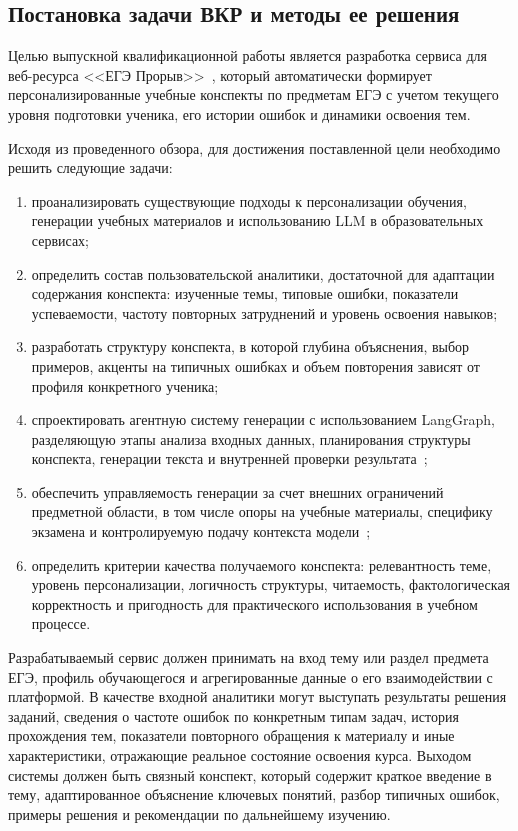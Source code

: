 \documentclass[a4paper,12pt]{extarticle}
\begin{document}
\subsection{Постановка задачи ВКР и методы ее решения}

Целью выпускной квалификационной работы является разработка сервиса для веб-ресурса <<ЕГЭ Прорыв>>~\cite{exambreakout2026}, 
который автоматически формирует персонализированные учебные конспекты по предметам ЕГЭ с учетом текущего уровня 
подготовки ученика, его истории ошибок и динамики освоения тем.

Исходя из проведенного обзора, для достижения поставленной цели необходимо решить следующие задачи:

\begin{enumerate}
    \item проанализировать существующие подходы к персонализации обучения, генерации учебных материалов и 
	использованию LLM в образовательных сервисах;
    \item определить состав пользовательской аналитики, достаточной для адаптации содержания конспекта: 
	изученные темы, типовые ошибки, показатели успеваемости, частоту повторных затруднений и уровень освоения навыков;
    \item разработать структуру конспекта, в которой глубина объяснения, выбор примеров, акценты на типичных 
	ошибках и объем повторения зависят от профиля конкретного ученика;
    \item спроектировать агентную систему генерации с использованием LangGraph, разделяющую этапы анализа 
	входных данных, планирования структуры конспекта, генерации текста и внутренней проверки 
	результата~\cite{langchain2024};
    \item обеспечить управляемость генерации за счет внешних ограничений предметной области, в том числе опоры 
	на учебные материалы, специфику экзамена и контролируемую подачу контекста модели~\cite{lewis2020rag,ding2025ragedu};
    \item определить критерии качества получаемого конспекта: релевантность теме, уровень персонализации, 
	логичность структуры, читаемость, фактологическая корректность и пригодность для практического использования 
	в учебном процессе.
\end{enumerate}

Разрабатываемый сервис должен принимать на вход тему или раздел предмета ЕГЭ, профиль обучающегося и агрегированные 
данные о его взаимодействии с платформой. В качестве входной аналитики могут выступать результаты решения заданий, 
сведения о частоте ошибок по конкретным типам задач, история прохождения тем, показатели повторного обращения 
к материалу и иные характеристики, отражающие реальное состояние освоения курса. Выходом системы должен быть 
связный конспект, который содержит краткое введение в тему, адаптированное объяснение ключевых понятий, 
разбор типичных ошибок, примеры решения и рекомендации по дальнейшему изучению.
\end{document}
